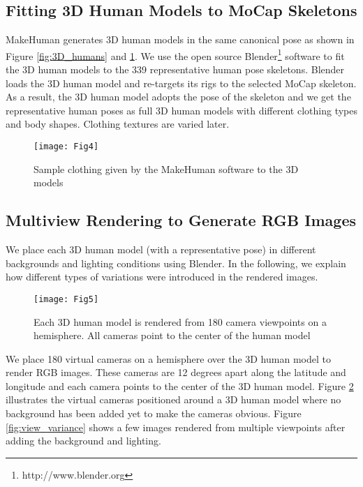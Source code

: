\documentclass[twocolumn]{svjour3}          \smartqed  \usepackage{graphicx}
\begin{document}
\subsection{Fitting 3D Human Models to MoCap Skeletons}
MakeHuman generates 3D human models in the same canonical pose as shown in Figure \ref{fig:3D_humans} and \ref{fig:default_clothing}. We use the open source Blender\footnote{http://www.blender.org} software to fit the 3D human models to the 339 representative human pose skeletons. Blender loads the 3D human model and re-targets its rigs to the selected MoCap skeleton. As a result, the 3D human model adopts the pose of the skeleton and we get the representative human poses as full 3D human models with different clothing types and body shapes. Clothing textures are varied later.

\begin{figure}[t]
\centering
\texttt{[image: Fig4]}
\caption{Sample clothing given by the MakeHuman software to the 3D models}
\label{fig:default_clothing}
\vspace{-1mm}
\end{figure}


\subsection{Multiview Rendering to Generate RGB Images}

We place each 3D human model (with a representative pose) in different backgrounds and lighting conditions using Blender. In the following, we explain how different types of variations were introduced in the rendered images.

\begin{figure}[t]
\centering
\texttt{[image: Fig5]}
\caption{Each 3D human model is rendered from 180 camera viewpoints on a hemisphere. All cameras point to the center of the human model}
\label{fig:mv_render}
\vspace{-1mm}
\end{figure}

\vspace{2mm}
   We place 180 virtual cameras on a hemisphere over the 3D human model to render RGB images. These cameras are 12 degrees apart along the latitude and longitude and each camera points to the center of the 3D human model. Figure \ref{fig:mv_render} illustrates the virtual cameras positioned around a 3D human model where no background has been added yet to make the cameras obvious. Figure \ref{fig:view_variance} shows a few images rendered from multiple viewpoints after adding the background and lighting.
\end{document}
